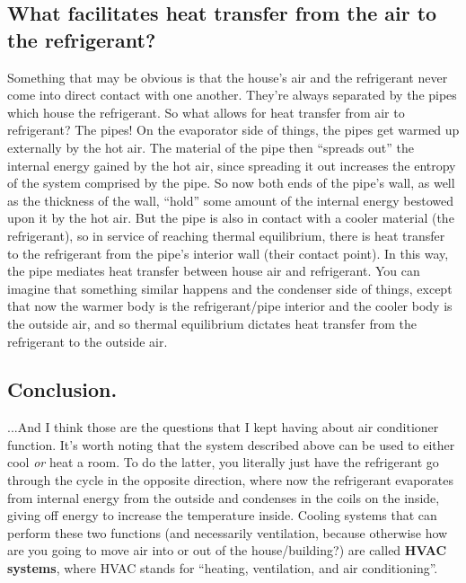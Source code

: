 \documentclass[../main/main.tex]{subfiles}
\begin{document}
\subsection{What facilitates heat transfer from the air to the refrigerant?}

Something that may be obvious is that the house's air and the refrigerant
never come into direct contact with one another.
They're always separated by the pipes which house the refrigerant.
So what allows for heat transfer from air to refrigerant?
The pipes! On the evaporator side of things, the pipes get warmed up
externally by the hot air. The material of the pipe then ``spreads out''
the internal energy gained by the hot air, since spreading it out
increases the entropy of the system comprised by the pipe.
So now both ends of the pipe's wall, as well as the thickness of the wall,
``hold'' some amount of the internal energy bestowed upon it by the hot air.
But the pipe is also in contact with a cooler material (the refrigerant),
so in service of reaching thermal equilibrium, there is heat transfer
to the refrigerant from the pipe's interior wall (their contact point).
In this way, the pipe mediates heat transfer between house air and refrigerant.
You can imagine that something similar happens and the condenser side of things,
except that now the warmer body is the refrigerant/pipe interior
and the cooler body is the outside air, and so thermal equilibrium dictates
heat transfer from the refrigerant to the outside air.

\subsection{Conclusion.}

...And I think those are the questions that I kept having about
air conditioner function.
It's worth noting that the system described above can be used
to either cool \emph{or} heat a room. To do the latter,
you literally just have the refrigerant go through the cycle
in the opposite direction, where now the refrigerant evaporates
from internal energy from the outside and condenses in the coils
on the inside, giving off energy to increase the temperature
inside. Cooling systems that can perform these two functions
(and necessarily ventilation, because otherwise how are you
going to move air into or out of the house/building?)
are called \textbf{HVAC systems},
where HVAC stands for 
``heating, ventilation, and air conditioning''.\par
\end{document}

